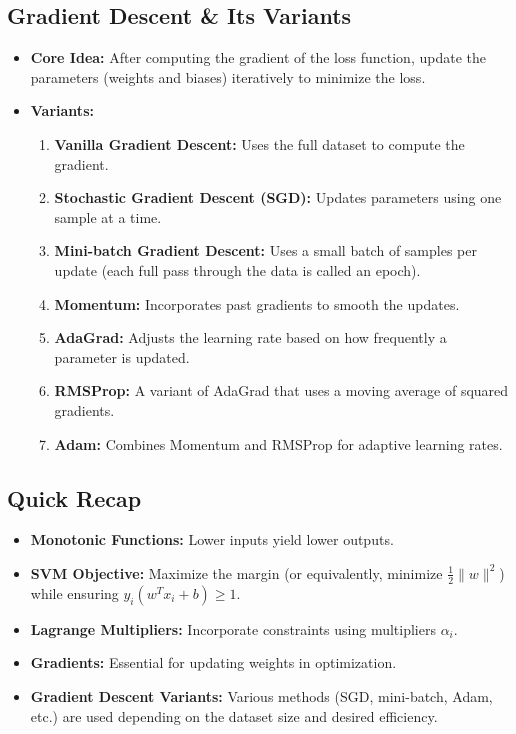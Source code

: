 \documentclass[11pt]{article}
\begin{document}
\subsection{Gradient Descent \& Its Variants}
\begin{itemize}
    \item \textbf{Core Idea:} After computing the gradient of the loss function, update the parameters (weights and biases) iteratively to minimize the loss.
    \item \textbf{Variants:}
    \begin{enumerate}[label=\arabic*.]
        \item \textbf{Vanilla Gradient Descent:} Uses the full dataset to compute the gradient.
        \item \textbf{Stochastic Gradient Descent (SGD):} Updates parameters using one sample at a time.
        \item \textbf{Mini-batch Gradient Descent:} Uses a small batch of samples per update (each full pass through the data is called an epoch).
        \item \textbf{Momentum:} Incorporates past gradients to smooth the updates.
        \item \textbf{AdaGrad:} Adjusts the learning rate based on how frequently a parameter is updated.
        \item \textbf{RMSProp:} A variant of AdaGrad that uses a moving average of squared gradients.
        \item \textbf{Adam:} Combines Momentum and RMSProp for adaptive learning rates.
    \end{enumerate}
\end{itemize}

\subsection{Quick Recap}
\begin{itemize}
    \item \textbf{Monotonic Functions:} Lower inputs yield lower outputs.
    \item \textbf{SVM Objective:} Maximize the margin (or equivalently, minimize $\frac{1}{2}\|w\|^2$) while ensuring $y_i (w^T x_i + b) \geq 1$.
    \item \textbf{Lagrange Multipliers:} Incorporate constraints using multipliers $\alpha_i$.
    \item \textbf{Gradients:} Essential for updating weights in optimization.
    \item \textbf{Gradient Descent Variants:} Various methods (SGD, mini-batch, Adam, etc.) are used depending on the dataset size and desired efficiency.
\end{itemize}
\end{document}
